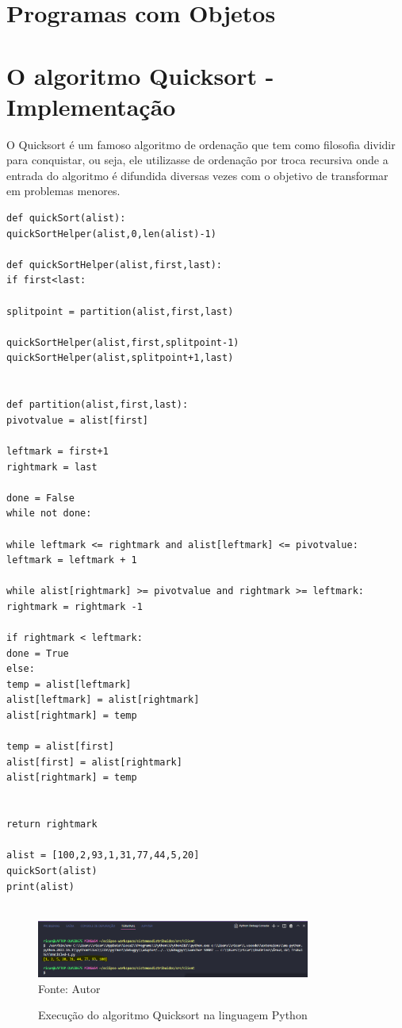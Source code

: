     \section{Programas com Objetos}


    \section{O algoritmo Quicksort - Implementa\c{c}\~{a}o}

O Quicksort é um famoso algoritmo de ordenação que tem como filosofia dividir para conquistar, ou seja, ele utilizasse de ordenação por troca recursiva onde a entrada do algoritmo é difundida diversas vezes com o objetivo de transformar em problemas menores.

\begin{lstlisting}
def quickSort(alist):
quickSortHelper(alist,0,len(alist)-1)

def quickSortHelper(alist,first,last):
if first<last:

splitpoint = partition(alist,first,last)

quickSortHelper(alist,first,splitpoint-1)
quickSortHelper(alist,splitpoint+1,last)


def partition(alist,first,last):
pivotvalue = alist[first]

leftmark = first+1
rightmark = last

done = False
while not done:

while leftmark <= rightmark and alist[leftmark] <= pivotvalue:
leftmark = leftmark + 1

while alist[rightmark] >= pivotvalue and rightmark >= leftmark:
rightmark = rightmark -1

if rightmark < leftmark:
done = True
else:
temp = alist[leftmark]
alist[leftmark] = alist[rightmark]
alist[rightmark] = temp

temp = alist[first]
alist[first] = alist[rightmark]
alist[rightmark] = temp


return rightmark

alist = [100,2,93,1,31,77,44,5,20]
quickSort(alist)
print(alist)
	
\end{lstlisting}

\begin{figure}[H]
	\begin{center}
		\caption{Execução do algoritmo Quicksort na linguagem Python} \label{ling1}
		\includegraphics[width=9cm]{quicksort.PNG} \\
		{\tiny \sf Fonte:{ Autor}}
	\end{center}
\end{figure}


